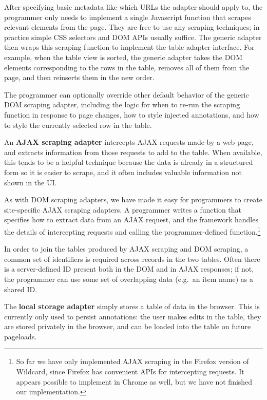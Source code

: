 \documentclass[sigplan,screen,10pt,anonymous,review]{acmart}
\begin{document}
After specifying basic metadata like which URLs the adapter should apply
to, the programmer only needs to implement a single Javascript function
that scrapes relevant elements from the page. They are free to use any
scraping techniques; in practice simple CSS selectors and DOM APIs
usually suffice. The generic adapter then wraps this scraping function
to implement the table adapter interface. For example, when the table
view is sorted, the generic adapter takes the DOM elements corresponding
to the rows in the table, removes all of them from the page, and then
reinserts them in the new order.

The programmer can optionally override other default behavior of the
generic DOM scraping adapter, including the logic for when to re-run the
scraping function in response to page changes, how to style injected
annotations, and how to style the currently selected row in the table.

An \textbf{AJAX scraping adapter} intercepts AJAX requests made by a web
page, and extracts information from those requests to add to the table.
When available, this tends to be a helpful technique because the data is
already in a structured form so it is easier to scrape, and it often
includes valuable information not shown in the UI.

As with DOM scraping adapters, we have made it easy for programmers to
create site-specific AJAX scraping adapters. A programmer writes a
function that specifies how to extract data from an AJAX request, and
the framework handles the details of intercepting requests and calling
the programmer-defined function.\footnote{So far we have only
  implemented AJAX scraping in the Firefox version of Wildcard, since
  Firefox has convenient APIs for intercepting requests. It appears
  possible to implement in Chrome as well, but we have not finished our
  implementation.}

In order to join the tables produced by AJAX scraping and DOM scraping,
a common set of identifiers is required across records in the two
tables. Often there is a server-defined ID present both in the DOM and
in AJAX responses; if not, the programmer can use some set of
overlapping data (e.g.~an item name) as a shared ID.

The \textbf{local storage adapter} simply stores a table of data in the
browser. This is currently only used to persist annotations: the user
makes edits in the table, they are stored privately in the browser, and
can be loaded into the table on future pageloads.
\end{document}

